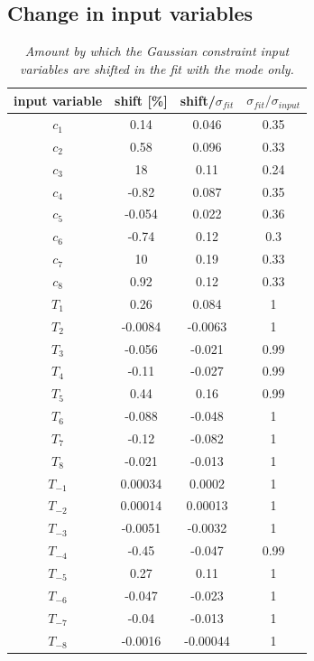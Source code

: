\subsection{Change in input variables}
\begin{table}[!h]
	\begin{center}
		\begin{tabular}{c| c| c|c}
			input variable & \quad shift [\%] \quad & shift/$\sigma_{fit}$ & \quad $\sigma_{fit}/ \sigma_{input}$\\
			\hline
			\hline
$c_1$ & 0.14 & 0.046 & 0.35\\ 
$c_2$ & 0.58 & 0.096 & 0.33\\ 
$c_3$ & 18 & 0.11 & 0.24\\ 
$c_4$ & -0.82 & 0.087 & 0.35\\ 
$c_5$ & -0.054 & 0.022 & 0.36\\ 
$c_6$ & -0.74 & 0.12 & 0.3\\ 
$c_7$ & 10 & 0.19 & 0.33\\ 
$c_8$ & 0.92 & 0.12 & 0.33\\ 
$T_1$ & 0.26 & 0.084 & 1\\ 
$T_2$ & -0.0084 & -0.0063 & 1\\ 
$T_3$ & -0.056 & -0.021 & 0.99\\ 
$T_4$ & -0.11 & -0.027 & 0.99\\ 
$T_5$ & 0.44 & 0.16 & 0.99\\ 
$T_6$ & -0.088 & -0.048 & 1\\ 
$T_7$ & -0.12 & -0.082 & 1\\ 
$T_8$ & -0.021 & -0.013 & 1\\ 
$T_{-1}$ & 0.00034 & 0.0002 & 1\\ 
$T_{-2}$ & 0.00014 & 0.00013 & 1\\ 
$T_{-3}$ & -0.0051 & -0.0032 & 1\\ 
$T_{-4}$ & -0.45 & -0.047 & 0.99\\ 
$T_{-5}$ & 0.27 & 0.11 & 1\\ 
$T_{-6}$ & -0.047 & -0.023 & 1\\ 
$T_{-7}$ & -0.04 & -0.013 & 1\\ 
$T_{-8}$ & -0.0016 & -0.00044 & 1\\ 
\end{tabular}
\end{center}
\caption{\textit{Amount by which the Gaussian constraint input variables are shifted in the fit with the \KsPiPi mode only.}}
\end{table} 
\clearpage

